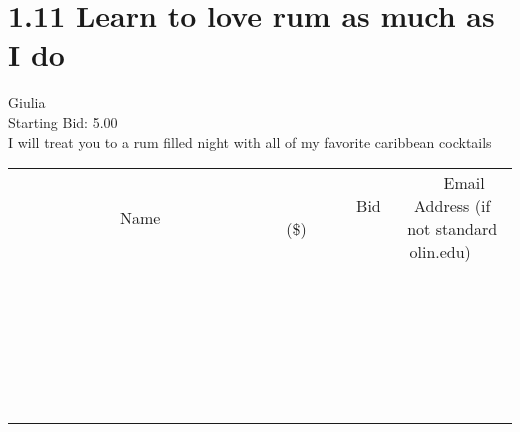 \documentclass[11pt]{article}
\begin{document}
					\section*{1.11 Learn to love rum as much as I do}
					Giulia \\
					Starting Bid: 5.00 \\
					I will treat you to a rum filled night with all of my favorite caribbean cocktails \\
					[6ex]
					\begin{tabular}{c c c}
						~~~~~~~~~~~~~Name~~~~~~~~~~~~~ & ~~~~~~~~~Bid (\$)~~~~~~~~~ & ~~~Email Address (if not standard olin.edu)~~~ \\
				
 & & \\
\hline
 & & \\
\hline
 & & \\
\hline
 & & \\
\hline
 & & \\
\hline
 & & \\
\hline
 & & \\
\hline
 & & \\
\hline
 & & \\
\hline
 & & \\
\hline
 & & \\
\hline
 & & \\
\hline
 & & \\
\hline
 & & \\
\hline
 & & \\
\hline
 & & \\
\hline
 & & \\
\hline
 & & \\
\hline
 & & \\
\hline
 & & \\
\hline
 & & \\
\hline
 & & \\
\hline
 & & \\
\hline
 & & \\
\hline
 & & \\
\hline
 & & \\
\hline
					\end{tabular}
					\clearpage
				
\end{document}
